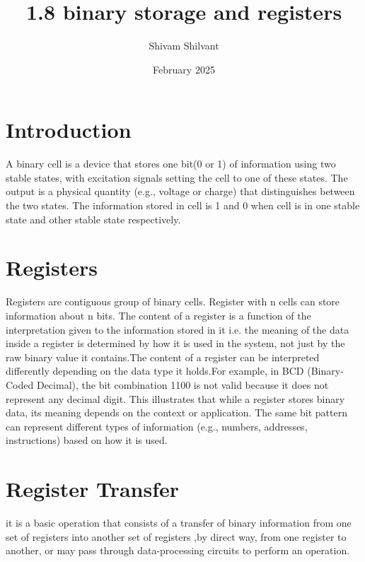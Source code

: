 \documentclass{article}
\title{1.8 binary storage and registers}
\author{Shivam Shilvant}
\date{February 2025}
\begin{document}
\maketitle

\section{Introduction}
A binary cell is a device that stores one bit(0 or 1) of information using two stable states, with excitation signals setting the cell to one of these states. The output is a physical quantity (e.g., voltage or charge) that distinguishes between the two states. The information stored in  cell is 1 and 0 when cell is in one stable state and other stable state respectively.

\section{Registers}
Registers are contiguous group of binary cells. Register with n cells can store information about n bits. The content of a register is a function of the interpretation given to the information stored in it i.e.  the meaning of the data inside a register is determined by how it is used in the system, not just by the raw binary value it contains.The content of a register can be interpreted differently depending on the data type it holds.For example, in BCD (Binary-Coded Decimal), the bit combination 1100 is not valid because it does not represent any decimal digit. This illustrates that while a register stores binary data, its meaning depends on the context or application. The same bit pattern can represent different types of information (e.g., numbers, addresses, instructions) based on how it is used.

\section{ Register Transfer}
it is a basic operation that consists of a transfer of binary information from one set of registers into another set of 
registers ,by direct way, from one register to another, or may pass through 
data-processing circuits to perform an operation. 
\end{document}
